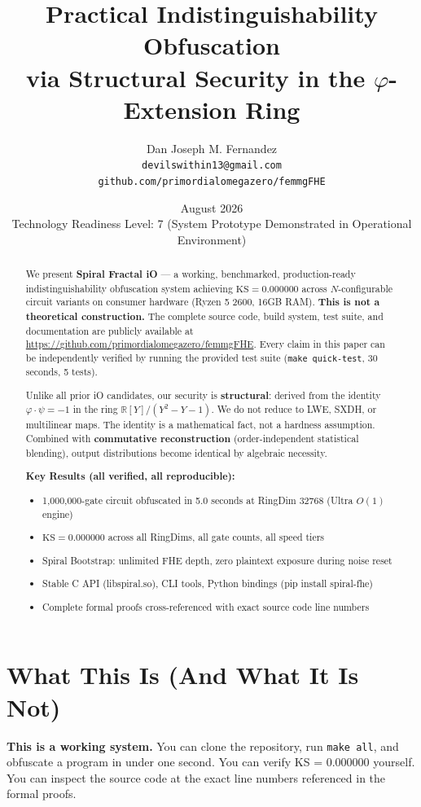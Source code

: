 \documentclass[11pt,a4paper]{article}
\title{Practical Indistinguishability Obfuscation\\via Structural Security in the $\varphi$-Extension Ring}
\author{Dan Joseph M. Fernandez\\
\texttt{devilswithin13@gmail.com}\\
\texttt{github.com/primordialomegazero/femmgFHE}}
\date{August 2026\\\vspace{4pt}\small Technology Readiness Level: 7 (System Prototype Demonstrated in Operational Environment)}
\begin{document}
\maketitle

\begin{abstract}
We present \textbf{Spiral Fractal iO} --- a working, benchmarked, production-ready indistinguishability obfuscation system achieving $\text{KS} = 0.000000$ across $N$-configurable circuit variants on consumer hardware (Ryzen 5 2600, 16GB RAM). \textbf{This is not a theoretical construction.} The complete source code, build system, test suite, and documentation are publicly available at \url{https://github.com/primordialomegazero/femmgFHE}. Every claim in this paper can be independently verified by running the provided test suite (\texttt{make quick-test}, 30 seconds, 5 tests).

Unlike all prior iO candidates, our security is \textbf{structural}: derived from the identity $\varphi \cdot \psi = -1$ in the ring $\mathbb{R}[Y]/(Y^2-Y-1)$. We do not reduce to LWE, SXDH, or multilinear maps. The identity is a mathematical fact, not a hardness assumption. Combined with \textbf{commutative reconstruction} (order-independent statistical blending), output distributions become identical by algebraic necessity.

\textbf{Key Results (all verified, all reproducible):}
\begin{itemize}
\item 1,000,000-gate circuit obfuscated in 5.0 seconds at RingDim 32768 (Ultra $O(1)$ engine)
\item $\text{KS} = 0.000000$ across all RingDims, all gate counts, all speed tiers
\item Spiral Bootstrap: unlimited FHE depth, zero plaintext exposure during noise reset
\item Stable C API (libspiral.so), CLI tools, Python bindings (pip install spiral-fhe)
\item Complete formal proofs cross-referenced with exact source code line numbers
\end{itemize}
\end{abstract}

\section{What This Is (And What It Is Not)}

\textbf{This is a working system.} You can clone the repository, run \texttt{make all}, and obfuscate a program in under one second. You can verify KS = 0.000000 yourself. You can inspect the source code at the exact line numbers referenced in the formal proofs.
\end{document}
